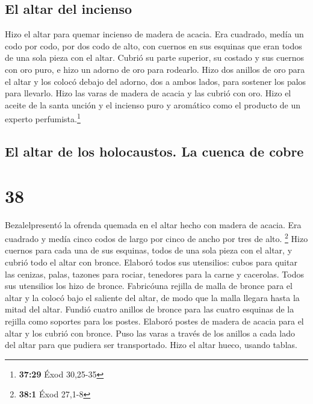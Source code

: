 \hypertarget{el-altar-del-incienso}{%
\subsection{El altar del incienso}\label{el-altar-del-incienso}}

 Hizo el altar para quemar incienso de madera de acacia.
Era cuadrado, medía un codo por codo, por dos codo de alto, con cuernos
en sus esquinas que eran todos de una sola pieza con el altar.
 Cubrió su parte superior, su costado y sus cuernos con
oro puro, e hizo un adorno de oro para rodearlo.  Hizo
dos anillos de oro para el altar y los colocó debajo del adorno, dos a
ambos lados, para sostener los palos para llevarlo.  Hizo
las varas de madera de acacia y las cubrió con oro.  Hizo
el aceite de la santa unción y el incienso puro y aromático como el
producto de un experto perfumista.\footnote{\textbf{37:29} Éxod 30,25-35}

\hypertarget{el-altar-de-los-holocaustos.-la-cuenca-de-cobre}{%
\subsection{El altar de los holocaustos. La cuenca de
cobre}\label{el-altar-de-los-holocaustos.-la-cuenca-de-cobre}}

\hypertarget{section-37}{%
\section{38}\label{section-37}}

 Bezalelpresentó la ofrenda quemada en el altar hecho con
madera de acacia. Era cuadrado y medía cinco codos de largo por cinco de
ancho por tres de alto. \footnote{\textbf{38:1} Éxod 27,1-8}
 Hizo cuernos para cada una de sus esquinas, todos de una
sola pieza con el altar, y cubrió todo el altar con bronce.
 Elaboró todos sus utensilios: cubos para quitar las
cenizas, palas, tazones para rociar, tenedores para la carne y
cacerolas. Todos sus utensilios los hizo de bronce. 
Fabricóuna rejilla de malla de bronce para el altar y la colocó bajo el
saliente del altar, de modo que la malla llegara hasta la mitad del
altar.  Fundió cuatro anillos de bronce para las cuatro
esquinas de la rejilla como soportes para los postes. 
Elaboró postes de madera de acacia para el altar y los cubrió con
bronce.  Puso las varas a través de los anillos a cada
lado del altar para que pudiera ser transportado. Hizo el altar hueco,
usando tablas.

